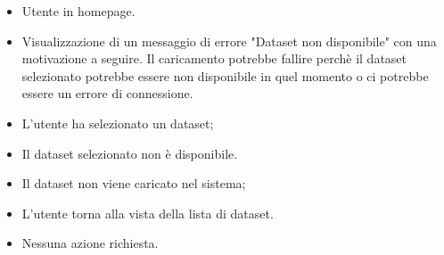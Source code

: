 \newpage

    \UCdsc
    { %
        \begin{itemize}
            \item Utente in homepage.
        \end{itemize}
    }
    { %
        \begin{itemize}
            \item Visualizzazione di un messaggio di errore "Dataset non disponibile" con una motivazione a seguire.
                    Il caricamento potrebbe fallire perchè il dataset selezionato potrebbe essere
                    non disponibile in quel momento o ci potrebbe essere un errore di connessione.
        \end{itemize}
    }
    { %
        \begin{itemize}
            \item L'utente ha selezionato un dataset;
            \item Il dataset selezionato non è disponibile.
        \end{itemize}
    }
    { %
        \begin{itemize}
            \item Il dataset non viene caricato nel sistema;
            \item L'utente torna alla vista della lista di dataset.
        \end{itemize}
    }
    { %
        \begin{itemize}
            \item Nessuna azione richiesta.
        \end{itemize}
    }



